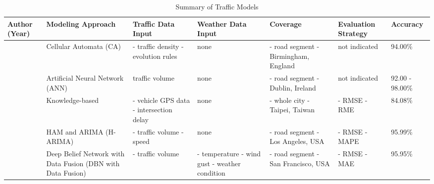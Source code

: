 \begin{sidewaystable}
	\caption{Summary of Traffic Models}
    \centering
    \begin{tabular}{| L{3cm} | L{3cm} | L{3cm} | L{3cm} | L{3cm} | L{3cm} | L{2cm} |} 
    
    \hline
    Author (Year) & Modeling Approach & Traffic Data Input & Weather Data Input & Coverage & Evaluation Strategy & Accuracy \\
    
    \hline
     &
    Cellular Automata (CA)  &
    - traffic density \newline - evolution rules &  
    none & 
    - road segment \newline - Birmingham, England & 
    not indicated &
    94.00\% \\
    
    \hline
     &
    Artificial Neural Network (ANN) &
    traffic volume &
    none &
    - road segment \newline - Dublin, Ireland & 
    not indicated &
    92.00 - 98.00\% \\
    
    \hline
     &
    Knowledge-based &
    - vehicle GPS data
    \newline
	- intersection delay & 
    none &
    - whole city
    \newline
	- Taipei, Taiwan &
    - RMSE
    \newline
    - RME
    &
    84.08\% \\

	\hline
     & 
    HAM and ARIMA (H-ARIMA) &
    - traffic volume
    \newline
	- speed &
    none &
    - road segment
    \newline
	- Los Angeles, USA &
    - RMSE
    \newline
    - MAPE
    &
    95.99\% \\

	\hline
     &
    Deep Belief Network with Data Fusion (DBN with Data Fusion) &
    - traffic volume &
    - temperature
    \newline
    - wind gust
    \newline
    - weather condition &
    - road segment
    \newline
    - San Francisco, USA &
    - RMSE
    \newline
    - MAE
    &
    95.95\% \\
    

\end{tabular}
\end{sidewaystable}
